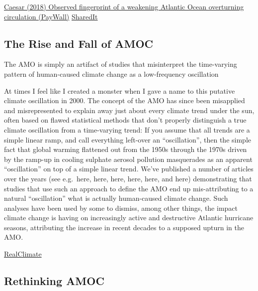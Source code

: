 \documentclass[
]{book}
\begin{document}
\href{https://www.nature.com/articles/s41586-018-0006-5}{Caesar (2018) Observed fingerprint of a weakening Atlantic Ocean overturning circulation (PayWall)}
\href{https://www.nature.com/articles/s41586-018-0006-5.epdf?author_access_token=d9GwXXnkYQw6itiGny0ZW9RgN0jAjWel9jnR3ZoTv0OdzeJ18XkImxSDnyYEEsE8cCDHkcmVSlMgRd2VzekBpzVfe728uOBU7B1e8unrLGpKyeWhlTvQKe6JHGdYV8iLm4nND7KgW4aTVEUH8xo0AA\%3D\%3D}{SharedIt}

\hypertarget{the-rise-and-fall-of-amoc}{%
\subsection{The Rise and Fall of AMOC}\label{the-rise-and-fall-of-amoc}}

The AMO is simply an artifact of studies that misinterpret
the time-varying pattern of human-caused climate change
as a low-frequency oscillation

At times I feel like I created a monster when I gave a name to this putative climate oscillation in 2000. The concept of the AMO has since been misapplied and misrepresented to explain away just about every climate trend under the sun, often based on flawed statistical methods that don't properly distinguish a true climate oscillation from a time-varying trend: If you assume that all trends are a simple linear ramp, and call everything left-over an ``oscillation'', then the simple fact that global warming flattened out from the 1950s through the 1970s driven by the ramp-up in cooling sulphate aerosol pollution masquerades as an apparent ``oscillation'' on top of a simple linear trend. We've published a number of articles over the years (see e.g.~here, here, here, here, here, and here) demonstrating that studies that use such an approach to define the AMO end up mis-attributing to a natural ``oscillation'' what is actually human-caused climate change. Such analyses have been used by some to dismiss, among other things, the impact climate change is having on increasingly active and destructive Atlantic hurricane seasons, attributing the increase in recent decades to a supposed upturn in the AMO.

\href{http://www.realclimate.org/index.php/archives/2021/03/the-rise-and-fall-of-the-atlantic-multidecadal-oscillation/}{RealClimate}

\hypertarget{rethinking-amoc}{%
\subsection{Rethinking AMOC}\label{rethinking-amoc}}
\end{document}
